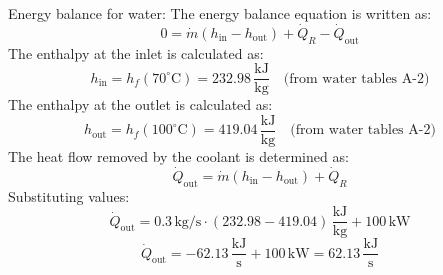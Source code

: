 Energy balance for water:  
The energy balance equation is written as:  
\[
0 = \dot{m} (h_{\text{in}} - h_{\text{out}}) + \dot{Q}_R - \dot{Q}_{\text{out}}
\]  
The enthalpy at the inlet is calculated as:  
\[
h_{\text{in}} = h_f(70^\circ\text{C}) = 232.98 \, \frac{\text{kJ}}{\text{kg}} \quad \text{(from water tables A-2)}
\]  
The enthalpy at the outlet is calculated as:  
\[
h_{\text{out}} = h_f(100^\circ\text{C}) = 419.04 \, \frac{\text{kJ}}{\text{kg}} \quad \text{(from water tables A-2)}
\]  
The heat flow removed by the coolant is determined as:  
\[
\dot{Q}_{\text{out}} = \dot{m} (h_{\text{in}} - h_{\text{out}}) + \dot{Q}_R
\]  
Substituting values:  
\[
\dot{Q}_{\text{out}} = 0.3 \, \text{kg/s} \cdot (232.98 - 419.04) \, \frac{\text{kJ}}{\text{kg}} + 100 \, \text{kW}
\]  
\[
\dot{Q}_{\text{out}} = -62.13 \, \frac{\text{kJ}}{\text{s}} + 100 \, \text{kW} = 62.13 \, \frac{\text{kJ}}{\text{s}}
\]